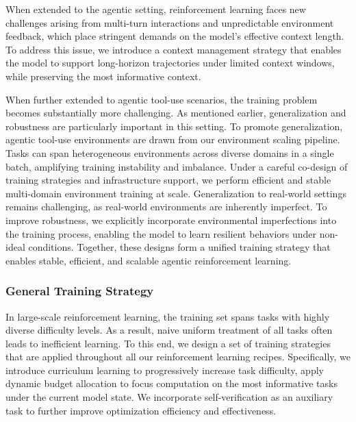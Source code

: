 \documentclass{article}
\begin{document}
When extended to the agentic setting, reinforcement learning faces new challenges arising from multi-turn interactions and unpredictable environment feedback, which place stringent demands on the model’s effective context length.
To address this issue, we introduce a context management strategy that enables the model to support long-horizon trajectories under limited context windows, while preserving the most informative context.

When further extended to agentic tool-use scenarios, the training problem becomes substantially more challenging.
As mentioned earlier, generalization and robustness are particularly important in this setting.
To promote generalization, agentic tool-use environments are drawn from our environment scaling pipeline.
Tasks can span heterogeneous environments across diverse domains in a single batch, amplifying training instability and imbalance.
Under a careful co-design of training strategies and infrastructure support, we perform efficient and stable multi-domain environment training at scale.
Generalization to real-world settings remains challenging, as real-world environments are inherently imperfect.
To improve robustness, we explicitly incorporate environmental imperfections into the training process, enabling the model to learn resilient behaviors under non-ideal conditions.
Together, these designs form a unified training strategy that enables stable, efficient, and scalable agentic reinforcement learning.


\subsubsection{General Training Strategy}
In large-scale reinforcement learning, the training set spans tasks with highly diverse difficulty levels.
As a result, naive uniform treatment of all tasks often leads to inefficient learning.
To this end, we design a set of training strategies that are applied throughout all our reinforcement learning recipes.
Specifically, we introduce curriculum learning to progressively increase task difficulty, apply dynamic budget allocation to focus computation on the most informative tasks under the current model state.
We incorporate self-verification as an auxiliary task to further improve optimization efficiency and effectiveness.
\end{document}
